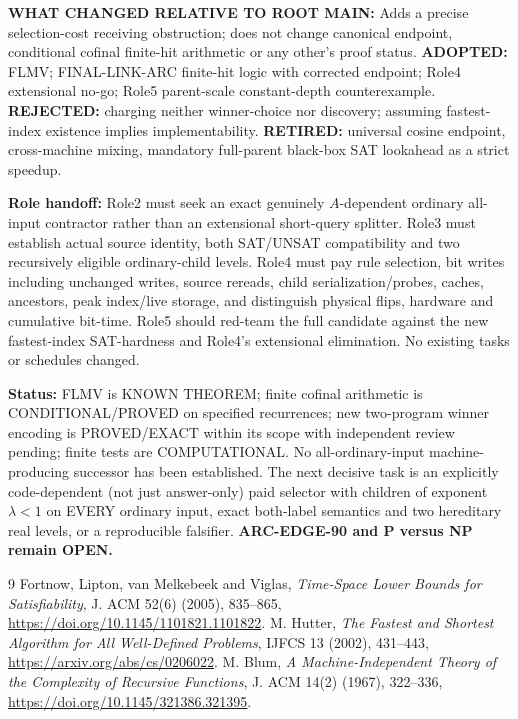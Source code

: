 \documentclass[11pt]{article}
\begin{document}
\textbf{WHAT CHANGED RELATIVE TO ROOT MAIN:} Adds a precise selection-cost receiving obstruction; does not change canonical endpoint, conditional cofinal finite-hit arithmetic or any other's proof status. 
\textbf{ADOPTED:} FLMV; FINAL-LINK-ARC finite-hit logic with corrected endpoint; Role4 extensional no-go; Role5 parent-scale constant-depth counterexample.
\textbf{REJECTED:} charging neither winner-choice nor discovery; assuming fastest-index existence implies implementability.
\textbf{RETIRED:} universal cosine endpoint, cross-machine mixing, mandatory full-parent black-box SAT lookahead as a strict speedup.

\textbf{Role handoff:} Role2 must seek an exact genuinely \(A\)-dependent ordinary all-input contractor rather than an extensional short-query splitter. Role3 must establish actual source identity, both SAT/UNSAT compatibility and two recursively eligible ordinary-child levels. Role4 must pay rule selection, bit writes including unchanged writes, source rereads, child serialization/probes, caches, ancestors, peak index/live storage, and distinguish physical flips, hardware and cumulative bit-time. Role5 should red-team the full candidate against the new fastest-index SAT-hardness and Role4's extensional elimination. No existing tasks or schedules changed.

\textbf{Status:} FLMV is KNOWN THEOREM; finite cofinal arithmetic is CONDITIONAL/PROVED on specified recurrences; new two-program winner encoding is PROVED/EXACT within its scope with independent review pending; finite tests are COMPUTATIONAL. No all-ordinary-input machine-producing successor has been established. The next decisive task is an explicitly code-dependent (not just answer-only) paid selector with children of exponent \(\lambda<1\) on EVERY ordinary input, exact both-label semantics and two hereditary real levels, or a reproducible falsifier. \textbf{ARC-EDGE-90 and P versus NP remain OPEN.}

\begin{thebibliography}{9}\small
{} Fortnow, Lipton, van Melkebeek and Viglas, \emph{Time-Space Lower Bounds for Satisfiability}, J. ACM 52(6) (2005), 835--865, \url{https://doi.org/10.1145/1101821.1101822}.
 M. Hutter, \emph{The Fastest and Shortest Algorithm for All Well-Defined Problems}, IJFCS 13 (2002), 431--443, \url{https://arxiv.org/abs/cs/0206022}.
 M. Blum, \emph{A Machine-Independent Theory of the Complexity of Recursive Functions}, J. ACM 14(2) (1967), 322--336, \url{https://doi.org/10.1145/321386.321395}.
\end{thebibliography}
\end{document}
